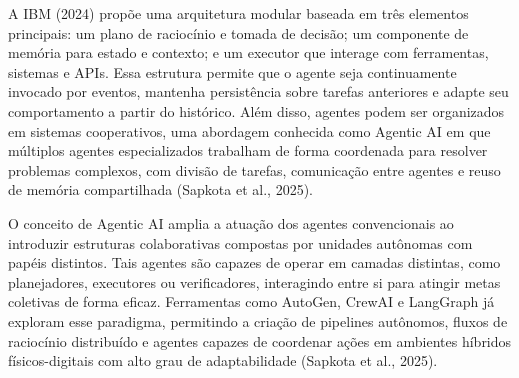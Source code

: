 A IBM (2024) propõe uma arquitetura modular baseada em três elementos principais: um plano de raciocínio e tomada de decisão; um componente de memória para estado e contexto; e um executor que interage com ferramentas, sistemas e APIs. Essa estrutura permite que o agente seja continuamente invocado por eventos, mantenha persistência sobre tarefas anteriores e adapte seu comportamento a partir do histórico. Além disso, agentes podem ser organizados em sistemas cooperativos, uma abordagem conhecida como Agentic AI  em que múltiplos agentes especializados trabalham de forma coordenada para resolver problemas complexos, com divisão de tarefas, comunicação entre agentes e reuso de memória compartilhada (Sapkota et al., 2025).

O conceito de Agentic AI amplia a atuação dos agentes convencionais ao introduzir estruturas colaborativas compostas por unidades autônomas com papéis distintos. Tais agentes são capazes de operar em camadas distintas, como planejadores, executores ou verificadores, interagindo entre si para atingir metas coletivas de forma eficaz. Ferramentas como AutoGen, CrewAI e LangGraph já exploram esse paradigma, permitindo a criação de pipelines autônomos, fluxos de raciocínio distribuído e agentes capazes de coordenar ações em ambientes híbridos físicos-digitais com alto grau de adaptabilidade (Sapkota et al., 2025).
